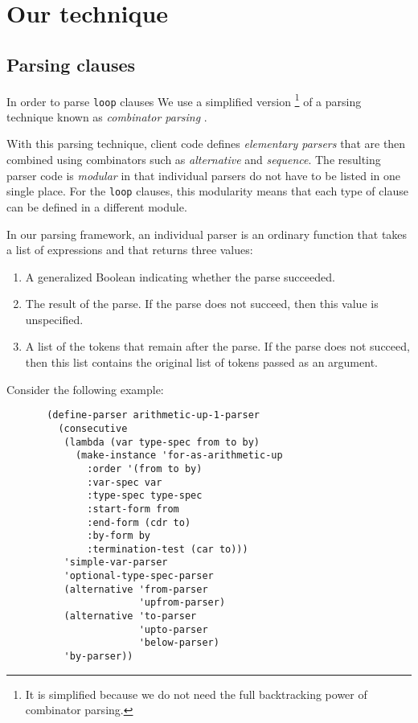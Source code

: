 \section{Our technique}
\label{sec-our-technique}

\subsection{Parsing clauses}
\label{sec-our-technique-parsing-clauses}

In order to parse \texttt{loop} clauses We use a simplified version%
\footnote{It is simplified because we do not need the full
  backtracking power of combinator parsing.}
of a parsing technique known as \emph{combinator parsing}
\cite{Wadler:1985:RFL:5280.5288}.

With this parsing technique, client code defines \emph{elementary
  parsers} that are then combined using combinators such as
\emph{alternative} and \emph{sequence}.  The resulting parser code is
\emph{modular} in that individual parsers do not have to be listed in
one single place.  For the \texttt{loop} clauses, this modularity
means that each type of clause can be defined in a different module.

In our parsing framework, an individual parser is an ordinary
\commonlisp{} function that takes a list of \commonlisp{} expressions
and that returns three values:

\begin{enumerate}
\item A generalized Boolean indicating whether the parse succeeded.
\item The result of the parse.  If the parse does not succeed, then
  this value is unspecified.
\item A list of the tokens that remain after the parse.  If the
  parse does not succeed, then this list contains the original
  list of tokens passed as an argument.
\end{enumerate}

Consider the following example:

{\small\begin{verbatim}
       (define-parser arithmetic-up-1-parser
         (consecutive
          (lambda (var type-spec from to by)
            (make-instance 'for-as-arithmetic-up
              :order '(from to by)
              :var-spec var
              :type-spec type-spec
              :start-form from
              :end-form (cdr to)
              :by-form by
              :termination-test (car to)))
          'simple-var-parser
          'optional-type-spec-parser
          (alternative 'from-parser
                       'upfrom-parser)
          (alternative 'to-parser
                       'upto-parser
                       'below-parser)
          'by-parser))
\end{verbatim}}

